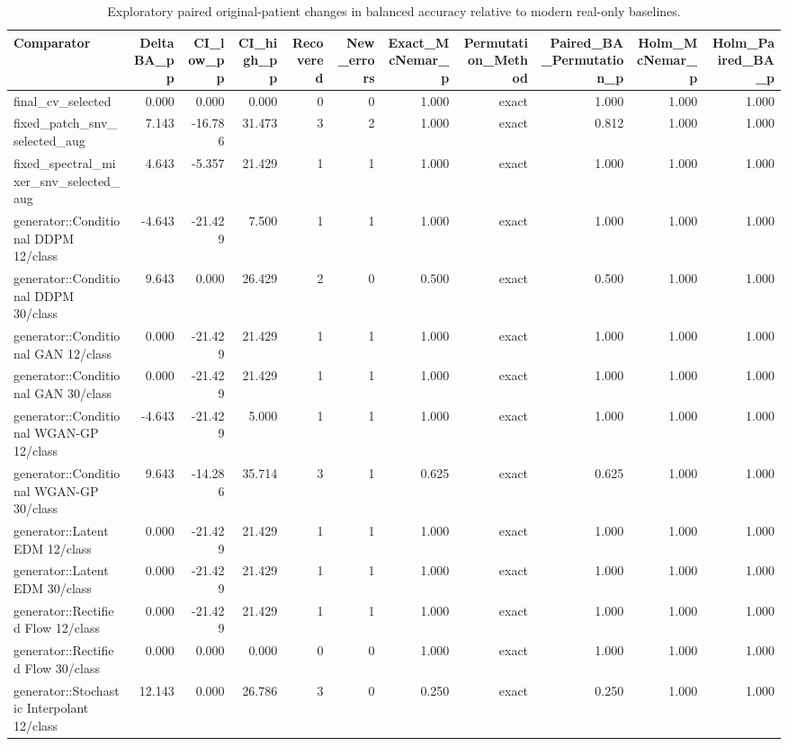 \begin{table}[t]
\centering
\caption{Exploratory paired original-patient changes in balanced accuracy relative to modern real-only baselines.}
\footnotesize
\begin{tabular}{lrrrrrrrrrr}
\toprule
Comparator & DeltaBA\_pp & CI\_low\_pp & CI\_high\_pp & Recovered & New\_errors & Exact\_McNemar\_p & Permutation\_Method & Paired\_BA\_Permutation\_p & Holm\_McNemar\_p & Holm\_Paired\_BA\_p \\
\midrule
final\_cv\_selected & 0.000 & 0.000 & 0.000 & 0 & 0 & 1.000 & exact & 1.000 & 1.000 & 1.000 \\
fixed\_patch\_snv\_selected\_aug & 7.143 & -16.786 & 31.473 & 3 & 2 & 1.000 & exact & 0.812 & 1.000 & 1.000 \\
fixed\_spectral\_mixer\_snv\_selected\_aug & 4.643 & -5.357 & 21.429 & 1 & 1 & 1.000 & exact & 1.000 & 1.000 & 1.000 \\
generator::Conditional DDPM 12/class & -4.643 & -21.429 & 7.500 & 1 & 1 & 1.000 & exact & 1.000 & 1.000 & 1.000 \\
generator::Conditional DDPM 30/class & 9.643 & 0.000 & 26.429 & 2 & 0 & 0.500 & exact & 0.500 & 1.000 & 1.000 \\
generator::Conditional GAN 12/class & 0.000 & -21.429 & 21.429 & 1 & 1 & 1.000 & exact & 1.000 & 1.000 & 1.000 \\
generator::Conditional GAN 30/class & 0.000 & -21.429 & 21.429 & 1 & 1 & 1.000 & exact & 1.000 & 1.000 & 1.000 \\
generator::Conditional WGAN-GP 12/class & -4.643 & -21.429 & 5.000 & 1 & 1 & 1.000 & exact & 1.000 & 1.000 & 1.000 \\
generator::Conditional WGAN-GP 30/class & 9.643 & -14.286 & 35.714 & 3 & 1 & 0.625 & exact & 0.625 & 1.000 & 1.000 \\
generator::Latent EDM 12/class & 0.000 & -21.429 & 21.429 & 1 & 1 & 1.000 & exact & 1.000 & 1.000 & 1.000 \\
generator::Latent EDM 30/class & 0.000 & -21.429 & 21.429 & 1 & 1 & 1.000 & exact & 1.000 & 1.000 & 1.000 \\
generator::Rectified Flow 12/class & 0.000 & -21.429 & 21.429 & 1 & 1 & 1.000 & exact & 1.000 & 1.000 & 1.000 \\
generator::Rectified Flow 30/class & 0.000 & 0.000 & 0.000 & 0 & 0 & 1.000 & exact & 1.000 & 1.000 & 1.000 \\
generator::Stochastic Interpolant 12/class & 12.143 & 0.000 & 26.786 & 3 & 0 & 0.250 & exact & 0.250 & 1.000 & 1.000 \\

\end{tabular}
\end{table}
